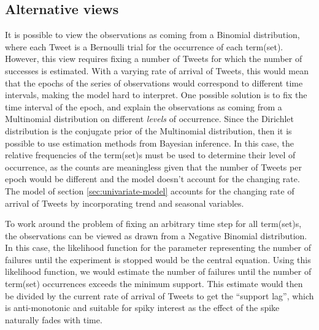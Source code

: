\documentclass[11pt]{llncs} %
\begin{document}
\subsection{Alternative views}
It is possible to view the observations as coming from a Binomial distribution, where each Tweet is a Bernoulli trial for the occurrence of each term(set). However, this view requires fixing a number of Tweets for which the number of successes is estimated. With a varying rate of arrival of Tweets, this would mean that the epochs of the series of observations would correspond to different time intervals, making the model hard to interpret. One possible solution is to fix the time interval of the epoch, and explain the observations as coming from a Multinomial distribution on different \emph{levels} of occurrence. Since the Dirichlet distribution is the conjugate prior of the Multinomial distribution, then it is possible to use estimation methods from Bayesian inference. In this case, the relative frequencies of the term(set)s must be used to determine their level of occurrence, as the counts are meaningless given that the number of Tweets per epoch would be different and the model doesn't account for the changing rate. The model of section \ref{sec:univariate-model} accounts for the changing rate of arrival of Tweets by incorporating trend and seasonal variables.

To work around the problem of fixing an arbitrary time step for all term(set)s, the observations can be viewed as drawn from a Negative Binomial distribution. In this case, the likelihood function for the parameter representing the number of failures until the experiment is stopped would be the central equation. Using this likelihood function, we would estimate the number of failures until the number of term(set) occurrences exceeds the minimum support. This estimate would then be divided by the current rate of arrival of Tweets to get the ``support lag'', which is anti-monotonic and suitable for spiky interest as the effect of the spike naturally fades with time. %
\end{document}
